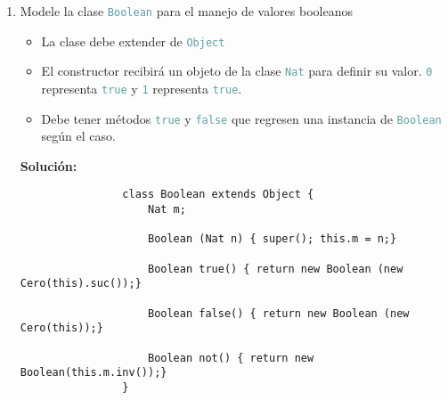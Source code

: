 \documentclass{article}
\newcommand{\tx}[1]{\textcolor{CadetBlue} {\texttt{#1}}}
\newcommand{\tb}[1]{\textcolor{RoyalPurple} {\textbf{#1}}}
\begin{document}
\begin{enumerate}
\begin{enumerate}
\begin{verbatim}
                    /** calcular el caso base del método auxiliar 'lt'
                    * $0 < n \iff bool(n) = True$
                    * @param Nat n número a comparar
                    * @return $this < n$
                    */
                    Booelan lt(Nat n) {return new Boolean(n);}

                    // método auxiliar para calcular 'not' en Boolean
                    Nat inv() {return this.suc();}
                }
            \end{verbatim}

            Donde \tx{not} está definido como

            \begin{verbatim}
                class Boolean extends Object {
                    ...
                    Boolean not() {return new Boolean(this.m.inv());}
                }
            \end{verbatim}

            \item Modele la clase \tx{Boolean} para el manejo de valores
            booleanos
            \begin{itemize}
                \item La clase debe extender de \tx{Object}

                \item El constructor recibirá un objeto de la clase \tx{Nat}
                para definir su valor. \tx{0} representa \tx{true} y \tx{1}
                representa \tx{true}.

                \item Debe tener métodos \tx{true} y \tx{false} que regresen una
                instancia de \tx{Boolean} según el caso.
            \end{itemize} 

            \tb{Solución:}
            \begin{verbatim}
                class Boolean extends Object {
                    Nat m;

                    Boolean (Nat n) { super(); this.m = n;}

                    Boolean true() { return new Boolean (new Cero(this).suc());}

                    Boolean false() { return new Boolean (new Cero(this));}

                    Boolean not() { return new Boolean(this.m.inv());}
                }
            \end{verbatim}
        \end{enumerate}
        

\end{enumerate}
\end{document}
